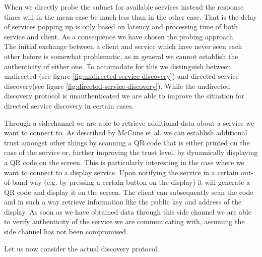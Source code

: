 When we directly probe the subnet for available services instead the response times will in the mean case be much less than in the other case.
That is the delay of services popping up is only based on latency and processing time of both service and client.
As a consequence we have chosen the probing approach.\\

The initial exchange between a client and service which have never seen each other before is somewhat problematic, as in general we cannot establish the authenticity of either one.
To accomodate for this we distinguish between undirected (see figure \ref{fig:undirected-service-discovery}) and directed service discovery(see figure \ref{fig:directed-service-discovery}).
While the undirected discovery protocol is unauthenticated we are able to improve the situation for directed service discovery in certain cases.

Through a sidechannel we are able to retrieve additional data about a service we want to connect to.
As described by McCune et al. \cite{mccune2005seeing} we can establish additional trust amongst other things by scanning a QR code that is either printed on the case of the service or, further improving the trust level, by dynamically displaying a QR code on the screen.
This is particularly interesting in the case where we want to connect to a display service.
Upon notifying the service in a certain out-of-band way (e.g. by pressing a certain button on the display) it will generate a QR code and display it on the screen.
The client can subsequently scan the code and in such a way retrieve information like the public key and address of the display.
As soon as we have obtained data through this side channel we are able to verify authenticity of the service we are communicating with, assuming the side channel has not been compromised.

Let us now consider the actual discovery protocol.

